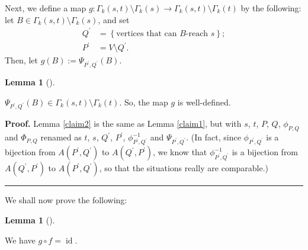 \documentclass[numbers=enddot,12pt,final,onecolumn,notitlepage]{scrartcl}%
\theoremstyle{definition}
\newtheorem{lem}[theo]{Lemma}
\newenvironment{lemma}[1][]
{\begin{lem}[#1]\begin{leftbar}}
{\end{leftbar}\end{lem}}
\newenvironment{proof}[1][Proof]{\noindent\textbf{#1.} }{\ \rule{0.5em}{0.5em}}
\theoremstyle{plainsl}
\begin{document}
Next, we define a map $g: \Gamma_{k}(s,t) \setminus\Gamma_{k}(s) \to\Gamma
_{k}(s,t) \setminus\Gamma_{k}(t)$ by the following: let $B \in\Gamma_{k}(s,t)
\setminus\Gamma_{k}(s)$, and set%
\begin{align*}
Q^{\prime}  &  =\left\{  \text{vertices that can }B\text{-reach }s\right\}
;\\
P^{\prime}  &  =V\setminus Q^{\prime}.
\end{align*}
Then, let $g\left(  B\right)  :=\Psi_{P^{\prime},Q^{\prime}}\left(  B\right)
$.

\begin{lemma}
\label{claim2}  $\Psi_{P^{\prime},Q^{\prime}}(B) \in\Gamma_{k}(s,t)
\setminus\Gamma_{k}(t)$. So, the map $g$ is well-defined.
\end{lemma}

\begin{proof}
Lemma \ref{claim2} is the same as Lemma \ref{claim1}, but with $s$, $t$, $P$,
$Q$, $\phi_{P,Q}$ and $\Phi_{P,Q}$ renamed as $t$, $s$, $Q^{\prime}$,
$P^{\prime}$, $\phi_{P^{\prime},Q^{\prime}}^{-1}$ and $\Psi_{P^{\prime
},Q^{\prime}}$. (In fact, since $\phi_{P^{\prime},Q^{\prime}}$ is a bijection
from $A\left(  P^{\prime},Q^{\prime}\right)  $ to $A\left(  Q^{\prime
},P^{\prime}\right)  $, we know that $\phi_{P^{\prime},Q^{\prime}}^{-1}$ is a
bijection from $A\left(  Q^{\prime},P^{\prime}\right)  $ to $A\left(
P^{\prime},Q^{\prime}\right)  $, so that the situations really are comparable.)
\end{proof}

We shall now prove the following:

\begin{lemma}
\label{claim3}  We have $g\circ f=\operatorname*{id}$.
\end{lemma}
\end{document}
